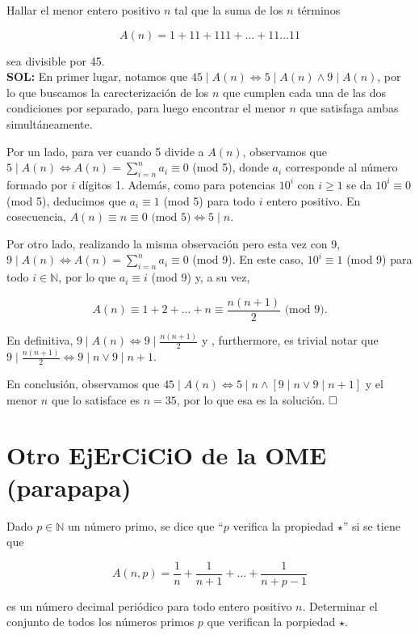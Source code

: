 \documentclass{article}
\begin{document}
Hallar el menor entero positivo $n$ tal que la suma de los $n$ términos

\[A(n) = 1 + 11 + 111 + ... + 11...11\]

\noindent sea divisible por 45. \\

\noindent\textbf{SOL:} En primer lugar, notamos que $45 \mid A(n) \iff 5 \mid A(n) \land 9 \mid A(n)$, por lo que buscamos la carecterización de los $n$ que cumplen cada una de las dos condiciones por separado, para luego encontrar el menor $n$ que satisfaga ambas simultáneamente.

Por un lado, para ver cuando 5 divide a $A(n)$, observamos que $5 \mid A(n) \iff A(n) = \sum_{i=n}^{n}a_i \equiv 0$ (mod 5), donde $a_i$ corresponde al número formado por $i$ dígitos 1. Además, como para potencias $10^i$ con $i \geq 1$ se da $10^i \equiv 0$ (mod 5), deducimos que $a_i \equiv 1$ (mod 5) para todo $i$ entero positivo. En cosecuencia, $A(n) \equiv n \equiv 0 \text{ (mod 5)} \iff 5 \mid n$.

Por otro lado, realizando la misma observación pero esta vez con 9, $9 \mid A(n) \iff A(n) = \sum_{i=n}^{n}a_i \equiv 0$ (mod 9). En este caso, $10^i \equiv 1$ (mod 9) para todo $i \in \mathbb{N}$, por lo que $a_i \equiv i$ (mod 9) y, a su vez,

\[A(n) \equiv 1 + 2 + ... + n \equiv \frac{n(n + 1)}{2}\text{ (mod 9)}.\]

\noindent En definitiva, $9 \mid A(n) \iff 9 \mid \frac{n(n + 1)}{2}$ y , furthermore, es trivial notar que $9 \mid \frac{n(n + 1)}{2} \iff 9 \mid n \lor 9 \mid n + 1$.

En conclusión, observamos que $45 \mid A(n) \iff 5 \mid n \land [9 \mid n \lor 9 \mid n + 1]$ y el menor $n$ que lo satisface es $n = 35$, por lo que esa es la solución. $\hfill\square$

\newpage

\section{Otro EjErCiCiO de la OME (parapapa)}

Dado $p \in \mathbb{N}$ un número primo, se dice que ``$p$ verifica la propiedad $\star$'' si se tiene que

\[A(n,p) = \frac{1}{n} + \frac{1}{n + 1} + ... + \frac{1}{n + p - 1}\]

\noindent es un número decimal periódico para todo entero positivo $n$. Determinar el conjunto de todos los números primos $p$ que verifican la porpiedad $\star$. \\
\end{document}
